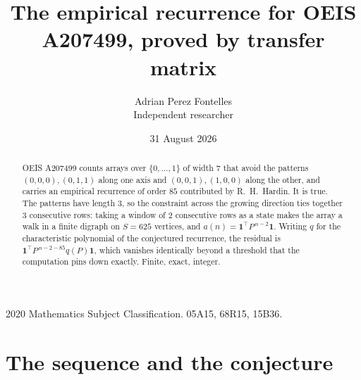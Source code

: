 \documentclass[11pt,a4paper]{article}
\title{The empirical recurrence for OEIS A207499, proved by transfer matrix}
\author{Adrian Perez Fontelles\\ \small Independent researcher}
\date{31 August 2026}
\theoremstyle{plain}
\theoremstyle{definition}
\begin{document}
\maketitle

\begin{abstract}
OEIS A207499 counts arrays over $\{0,\dots,1\}$ of width $7$ that avoid the patterns
$(0,0,0), (0,1,1)$ along one axis and $(0,0,1), (1,0,0)$ along the other, and carries an empirical recurrence of
order $85$ contributed by R.~H.~Hardin. It is true. The patterns have length $3$, so
the constraint across the growing direction ties together $3$ consecutive rows: taking a
window of $2$ consecutive rows as a state makes the array a walk in a finite digraph
on $S=625$ vertices, and $a(n)=\mathbf{1}^{\!\top}P^{\,n-2}\mathbf{1}$. Writing $q$
for the characteristic polynomial of the conjectured recurrence, the residual is
$\mathbf{1}^{\!\top}P^{\,n-2-85}q(P)\mathbf{1}$, which vanishes identically
beyond a threshold that the computation pins down exactly. Finite, exact, integer.
\end{abstract}

\noindent\small 2020 Mathematics Subject Classification. 05A15, 68R15, 15B36.\normalsize

\section{The sequence and the conjecture}
\end{document}
